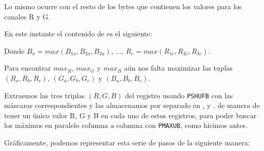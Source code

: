 Lo mismo ocurre con el resto de los bytes que contienen los valores para los canales R y G.

En este instante el contenido de  es el siguiente:

\begin{center}
\end{center}

Donde $B_a = max(B_{1a}, B_{2a}, B_{3a})$, $\dots$, $R_c = max(R_{1c}, R_{2c}, R_{3c})$.

Para encontrar $max_R$, $max_G$ y $max_B$ aún nos falta maximizar las tuplas
$(R_a, R_b, R_c)$, $(G_a, G_b, G_c)$ y $(B_a, B_b, B_c)$.

Extraemos las tres triplas $(R, G, B)$ del registro  usando
\texttt{PSHUFB} con las máscaras correspondientes y las almacenamos por separado en
,  y , de manera de tener un único valor R, G y B en cada uno de
estos registros, para poder buscar los máximos en paralelo columna a columna con
\texttt{PMAXUB}, como hicimos antes.

Gráficamente, podemos representar esta serie de pasos de la siguiente manera:

